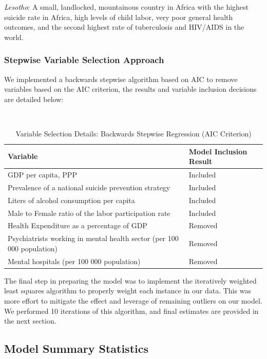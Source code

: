 \documentclass[]{article}
\begin{document}
\emph{Lesotho}: A small, landlocked, mountainous country in Africa with
the highest suicide rate in Africa, high levels of child labor, very
poor general health outcomes, and the second highest rate of
tuberculosis and HIV/AIDS in the world.

\subsubsection{Stepwise Variable Selection
Approach}\label{stepwise-variable-selection-approach}

We implemented a backwards stepwise algorithm based on AIC to remove
variables based on the AIC criterion, the results and variable inclusion
decisions are detailed below:

\begin{table}[H]
\centering 
\caption{Variable Selection Details: Backwards Stepwise Regression (AIC Criterion)}
\
\begin{tabular}{p{5cm}p{4cm}}  
\hline  
Variable & Model Inclusion Result \\  
\hline
GDP per capita, PPP & Included \\
\hline 
Prevalence of a national suicide prevention strategy & Included \\
\hline 
Liters of alcohol consumption per capita & Included \\
\hline 
Male to Female ratio of the labor participation rate & Included \\
\hline
Health Expenditure as a percentage of GDP & Removed \\
 \hline 
Psychiatrists working in mental health sector (per 100 000 population) & Removed \\   
\hline 
Mental hospitals (per 100 000 population) &  Removed \\
\hline 
\end{tabular} 
\end{table}

The final step in preparing the model was to implement the iteratively
weighted least squares algorithm to properly weight each instance in our
data. This was more effort to mitigate the effect and leverage of
remaining outliers on our model. We performed 10 iterations of this
algorithm, and final estimates are provided in the next section.

\subsection{Model Summary Statistics}\label{model-summary-statistics}
\end{document}

